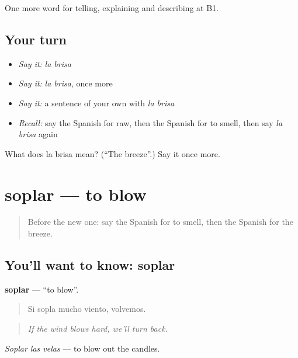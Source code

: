 \begin{grammarlens}[title={What you've built}]
One more word for telling, explaining and describing at B1.
\end{grammarlens}

\subsection*{Your turn}
\begin{itemize}
\raggedright
  \item \emph{Say it:} \emph{la brisa}
  \item \emph{Say it:} \emph{la brisa}, once more
  \item \emph{Say it:} a sentence of your own with \emph{la brisa}
  \item \emph{Recall:} say the Spanish for raw, then the Spanish for to smell, then say \emph{la brisa} again
\end{itemize}

\begin{tcolorbox}[breakable,colback=teal!4,colframe=teal!35!black,title={Before you move on}]
What does la brisa mean? (\textquotedblleft{}The breeze\textquotedblright{}.) Say it once more.
\end{tcolorbox}
\section[soplar]{soplar — to blow}

\label{lesson:ES-C772-soplar}



\begin{quote}
Before the new one: say the Spanish for to smell, then the Spanish for the breeze.
\end{quote}

\subsection*{You'll want to know: soplar}
\textbf{soplar} — \textquotedblleft{}to blow\textquotedblright{}.

\begin{quote}
Si sopla mucho viento, volvemos.
\end{quote}

\begin{quote}
\emph{If the wind blows hard, we'll turn back.}
\end{quote}

\emph{Soplar las velas} — to blow out the candles.

